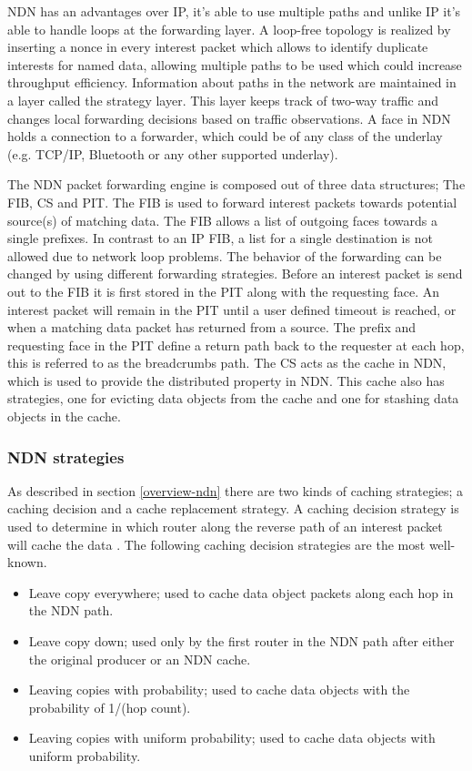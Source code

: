 NDN has an advantages over IP, it's able to use multiple paths and unlike IP it's able to handle loops at the forwarding layer. A loop-free topology is realized by inserting a nonce in every interest packet which allows to identify duplicate interests for named data, allowing multiple paths to be used which could increase throughput efficiency. Information about paths in the network are maintained in a layer called the strategy layer. This layer keeps track of two-way traffic and changes local forwarding decisions based on traffic observations. A face in NDN holds a connection to a forwarder, which could be of any class of the underlay (e.g. TCP/IP, Bluetooth or any other supported underlay).

The NDN packet forwarding engine is composed out of three data structures; The FIB, CS and PIT. The FIB is used to forward interest packets towards potential source(s) of matching data. The FIB allows a list of outgoing faces towards a single prefixes. In contrast to an IP FIB, a list for a single destination is not allowed due to network loop problems. The behavior of the forwarding can be changed by using different forwarding strategies. Before an interest packet is send out to the FIB it is first stored in the PIT along with the requesting face. An interest packet will remain in the PIT until a user defined timeout is reached, or when a matching data packet has returned from a source. The prefix and requesting face in the PIT define a return path back to the requester at each hop, this is referred to as the breadcrumbs path. The CS acts as the cache in NDN, which is used to provide the distributed property in NDN. This cache also has strategies, one for evicting data objects from the cache and one for stashing data objects in the cache.

\subsubsection{NDN strategies}
As described in section \ref{overview-ndn} there are two kinds of caching strategies; a caching decision and a cache replacement strategy. A caching decision strategy is used to determine in which router along the reverse path of an interest packet will cache the data \cite{koulouzis2018information}. The following caching decision strategies are the most well-known.

\begin{itemize}
    \item Leave copy everywhere; used to cache data object packets along each hop in the NDN path.
    \item Leave copy down; used only by the first router in the NDN path after either the original producer or an NDN cache.
    \item Leaving copies with probability; used to cache data objects with the probability of 1/(hop count).
    \item Leaving copies with uniform probability; used to cache data objects with uniform probability.
\end{itemize}

